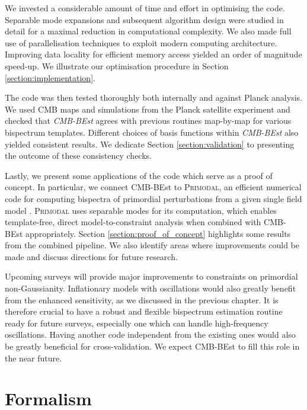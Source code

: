 We invested a considerable amount of time and effort in optimising the code. Separable mode expansions and subsequent algorithm design were studied in detail for a maximal reduction in computational complexity. We also made full use of parallelisation techniques to exploit modern computing architecture. Improving data locality for efficient memory access yielded an order of magnitude speed-up. We illustrate our optimisation procedure in Section \ref{section:implementation}.

The code was then tested thoroughly both internally and against Planck analysis. We used CMB maps and simulations from the Planck satellite experiment and checked that \textit{CMB-BEst} agrees with previous routines map-by-map for various bispectrum templates. Different choices of basis functions within \textit{CMB-BEst} also yielded consistent results. We dedicate Section \ref{section:validation} to presenting the outcome of these consistency checks.

Lastly, we present some applications of the code which serve as a proof of concept. In particular, we connect CMB-BEst to \textsc{Primodal}, an efficient numerical code for computing bispectra of primordial perturbations from a given single field model \cite{Clarke2021}. \textsc{Primodal} uses separable modes for its computation, which enables template-free, direct model-to-constraint analysis when combined with CMB-BEst appropriately. Section \ref{section:proof_of_concept} highlights some results from the combined pipeline. We also identify areas where improvements could be made and discuss directions for future research.

Upcoming surveys will provide major improvements to constraints on primordial non-Gaussianity. Inflationary models with oscillations would also greatly benefit from the enhanced sensitivity, as we discussed in the previous chapter. It is therefore crucial to have a robust and flexible bispectrum estimation routine ready for future surveys, especially one which can handle high-frequency oscillations. Having another code independent from the existing ones would also be greatly beneficial for cross-validation. We expect CMB-BEst to fill this role in the near future.


\section{Formalism}

